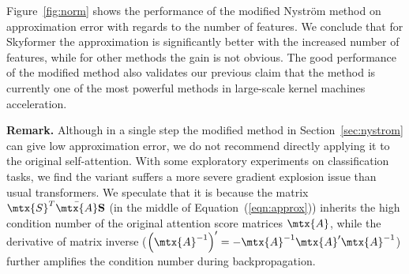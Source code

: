 Figure~\ref{fig:norm} shows the performance of the modified Nystr\"om method on approximation error with regards to the number of features.
We conclude that for Skyformer the approximation is significantly better with the increased number of features, while for other methods the gain is not obvious.
The good performance of the modified \nystrom method also validates our previous claim that the \nystrom method is currently one of the most powerful methods in large-scale kernel machines acceleration.

\textbf{Remark.} 
Although in a single step the modified \nystrom method in Section~\ref{sec:nystrom} can give low approximation error, we do not recommend directly applying it to the original self-attention.
With some exploratory experiments on classification tasks, we find the variant suffers a more severe gradient explosion issue than usual transformers.
We speculate that it is because the matrix $\mtx{S}^{T} \bar{\mtx{A}}\textbf{S}$ (in the middle of Equation~(\ref{eqn:approx})) inherits the high condition number of the original attention score matrices $\mtx{A}$, 
while the derivative of matrix inverse ($\left( \mtx{A}^{-1} \right)' = - \mtx{A}^{-1} \mtx{A}' \mtx{A}^{-1}$) further amplifies the condition number during backpropagation.






\iffalse



